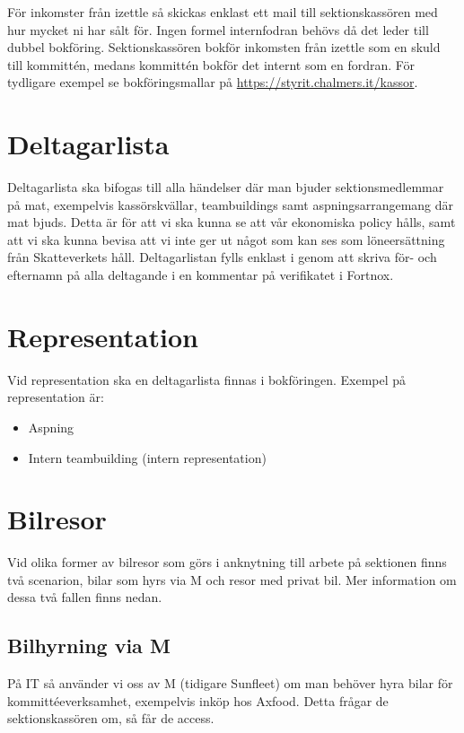\documentclass{article}
\begin{document}
För inkomster från izettle så skickas enklast ett mail till sektionskassören med hur mycket ni har sålt för. Ingen formel internfodran behövs då det leder till dubbel bokföring. Sektionskassören bokför inkomsten från izettle som en skuld till kommittén, medans kommittén bokför det internt som en fordran. För tydligare exempel se bokföringsmallar på \url{https://styrit.chalmers.it/kassor}.

\section{Deltagarlista}
Deltagarlista ska bifogas till alla händelser där man bjuder sektionsmedlemmar på mat, exempelvis kassörskvällar, teambuildings samt aspningsarrangemang där mat bjuds. Detta är för att vi ska kunna se att vår ekonomiska policy hålls, samt att vi ska kunna bevisa att vi inte ger ut något som kan ses som löneersättning från Skatteverkets håll. Deltagarlistan fylls enklast i genom att skriva för- och efternamn på alla deltagande i en kommentar på verifikatet i Fortnox.


\section{Representation}
Vid representation ska en deltagarlista finnas i bokföringen. Exempel på representation är:
\begin{itemize}
    \item Aspning
    \item Intern teambuilding (intern representation)
\end{itemize}

\section{Bilresor}
Vid olika former av bilresor som görs i anknytning till arbete på sektionen finns två scenarion, bilar som hyrs via M och resor med privat bil. Mer information om dessa två fallen finns nedan.

\subsection{Bilhyrning via M}
\label{sec:sunfleet}
På IT så använder vi oss av M (tidigare Sunfleet) om man behöver hyra bilar för kommittéeverksamhet, exempelvis inköp hos Axfood. Detta frågar de sektionskassören om, så får de access. 
\end{document}
